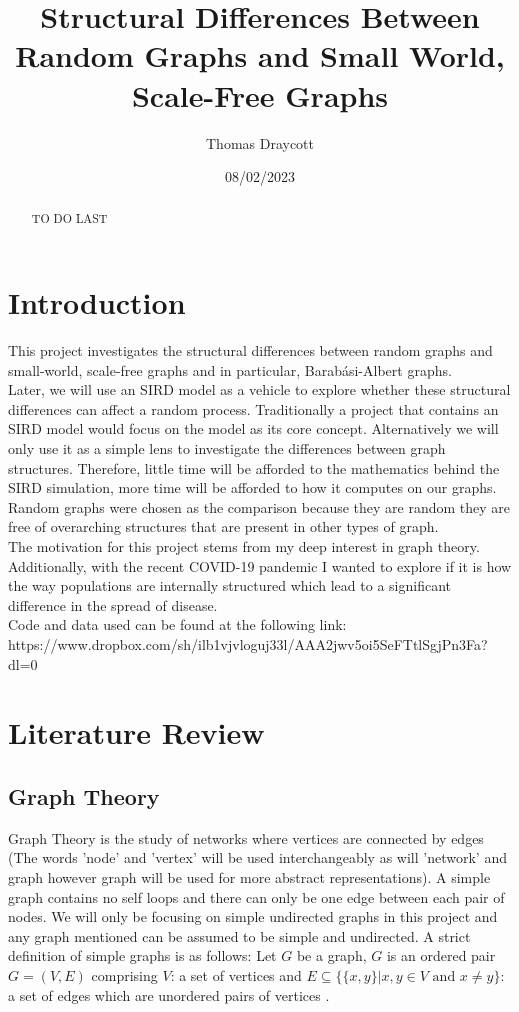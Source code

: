 \documentclass{article}
\title{Structural Differences Between Random Graphs and Small World, Scale-Free Graphs }
\date{08/02/2023}
\author{Thomas Draycott}
\begin{document}
    \maketitle
    \newpage
    \begin{abstract}
        TO DO LAST
    \end{abstract}
    \tableofcontents
    \newpage
    \section{Introduction}
    This project investigates the structural differences between random graphs and small-world, scale-free graphs and in particular, Barabási-Albert graphs.\\
    Later, we will use an SIRD model as a vehicle to explore whether these structural differences can affect a random process. Traditionally a project that contains an SIRD model would focus on the model as its core concept. Alternatively we will only use it as a simple lens to investigate the differences between graph structures. Therefore, little time will be afforded to the mathematics behind the SIRD simulation, more time will be afforded to how it computes on our graphs.\\
    Random graphs were chosen as the comparison because they are random they are free of overarching structures that are present in other types of graph.\\
    The motivation for this project stems from my deep interest in graph theory. Additionally, with the recent COVID-19 pandemic I wanted to explore if it is how the way populations are internally structured which lead to a significant difference in the spread of disease.\\
    Code and data used can be found at the following link:\\ 
    https://www.dropbox.com/sh/ilb1vjvloguj33l/AAA2jwv5oi5SeFTtlSgjPn3Fa?dl=0
    \section{Literature Review}
        \subsection{Graph Theory}
        Graph Theory is the study of networks where vertices are connected by edges (The words 'node' and 'vertex' will be used interchangeably as will 'network' and graph however graph will be used for more abstract representations). A simple graph contains no self loops and there can only be one edge between each pair of nodes. We will only be focusing on simple undirected graphs in this project and any graph mentioned can be assumed to be simple and undirected. A strict definition of simple graphs is as follows: Let $G$ be a graph, $G$ is an ordered pair $G=(V,E)$ comprising $V$: a set of vertices and $E\subseteq \{\{x,y\} | x,y \in V \text{ and } x\neq y\}$: a set of edges which are unordered pairs of vertices \parencite{bender2010lists}.
\end{document}
